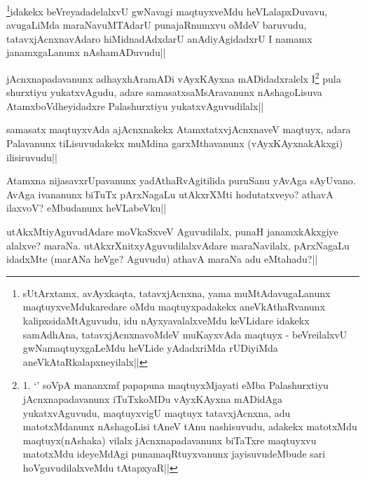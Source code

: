 \begin{artha}
\footnote{sUtArxtamx, avAyxkaqta, tatavxjAcnxna, yama muMtAdavugaLanunx 
maqtuyxveMdukaredare oMdu maqtuyxpadakekx aneVkAthaRvanunx kalipxsidaMtAguvudu, idu 
nAyxyavalalxveMdu keVLidare idakekx samAdhAna, tatavxjAcnxnavoMdeV muKayxvAda maqtuyx -   
beVreilalxvU gwNamaqtuyxgaLeMdu heVLide yAdadxriMda rUDiyiMda 
aneVkAtaRkalapxneyilalx||}idakekx 
beVreyadadelalxvU gwNavagi maqtuyxveMdu heVLalapxDuvavu, avugaLiMda maraNavuMTAdarU 
punajaRnumxvu oMdeV baruvudu, tatavxjAcnxnavAdaro hiMidnadAdxdarU anAdiyAgidadxrU I namamx 
janamxgaLanunx nAshamADuvudu||
\end{artha}

\begin{artha}
jAcnxnapadavanunx adhayxhAramADi vAyxKAyxna mADidadxralelx I\footnote{1. `\stext' soV\s pA mananxmf papapuna maqtuyxMjayati eMba Palashurxtiyu jAcnxnapadavanunx iTuTxkoMDu vAyxKAyxna mADidAga yukatxvAguvudu, maqtuyxvigU maqtuyx tatavxjAcnxna, adu matotxMdanunx nAshagoLisi tAneV tAnu nashisuvudu, adakekx matotxMdu maqtuyx(nAshaka) vilalx jAcnxnapadavanunx biTaTxre maqtuyxvu matotxMdu ideyeMdAgi punamaqRtuyxvanunx jayisuvudeMbude sari hoVguvudilalxveMdu tAtapxyaR||} pula shurxtiyu yukatxvAgudu, adare samasatxsaMsAravanunx nAshagoLisuva AtamxboVdheyidadxre Palashurxtiyu yukatxvAguvudilalx||
\end{artha}


\begin{artha}
samasatx maqtuyxvAda ajAcnxnakekx AtamxtatxvjAcnxnaveV maqtuyx, adara Palavanunx tiLisuvudakekx muMdina garxMthavanunx (vAyxKAyxnakAkxgi) ilisiruvudu||
\end{artha}


\begin{artha}
Atamxna nijasavxrUpavanunx yadAthaRvAgitilida puruSanu yAvAga sAyUvano. AvAga ivananunx 
biTuTx pArxNagaLu utAkxrXMti hodutatxveyo? athavA ilaxvoV? eMbudanunx heVLabeVku||
\end{artha}



\begin{artha}
utAkxMtiyAguvudAdare moVkaSxveV Aguvudilalx, punaH janamxkAkxgiye alalxve? maraNa. 
utAkxrXnitxyAguvudilalxvAdare maraNavilalx, pArxNagaLu idadxMte (marANa heVge? Aguvudu) 
athavA maraNa adu eMtahadu?||
\end{artha}


